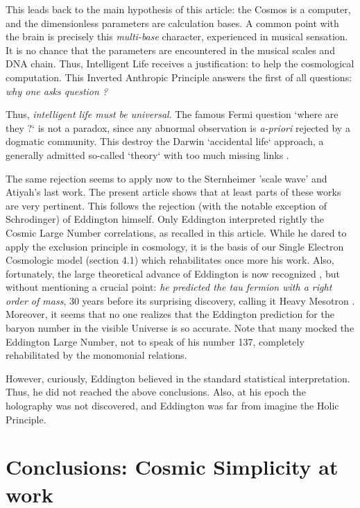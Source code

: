 \documentclass[twoside,draft]{article}
\begin{document}
\begin{sloppypar}
This leads back to the main hypothesis of this article: the Cosmos is a computer, and the dimensionless parameters are calculation bases. A common point with the brain is precisely this \textit{multi-base} character, experienced in musical sensation. It is no chance that the parameters are encountered in the musical scales and DNA chain. Thus, Intelligent Life receives a justification: to help the cosmological computation. This Inverted Anthropic Principle answers the first of all questions: \textit{why one asks question ?} 

Thus, \textit{intelligent life must be universal}. The famous Fermi question `where are they ?` is not a paradox, since any abnormal observation is \textit{a-priori} rejected by a dogmatic community. This destroy the Darwin `accidental life` approach, a generally admitted so-called `theory` with too much missing links \cite{Chauvin}.

The same rejection seems to apply now to the Sternheimer 'scale wave' and Atiyah's last work. The present article shows that at least parts of these works are very pertinent. This follows the rejection (with the notable exception of Schrodinger) of Eddington\cite{Eddington} himself. Only Eddington interpreted rightly the Cosmic Large Number correlations, as recalled in this article. While he dared to apply the exclusion principle in cosmology, it is the basis of our Single Electron Cosmologic model (section 4.1) which rehabilitates once more his work. Also, fortunately, the large theoretical advance of Eddington is now recognized \cite{Durham}, but without mentioning a crucial point: \textit{he predicted the tau fermion with a right order of mass}, 30 years before its surprising discovery, calling it Heavy Mesotron \cite{Eddington}. Moreover, it seems that no one realizes that the Eddington prediction for the baryon number in the visible Universe is so accurate. Note that many mocked the Eddington Large Number, not to speak of his number 137, completely rehabilitated by the monomonial relations.

However, curiously, Eddington believed in the standard statistical interpretation. Thus, he did not reached the above conclusions. Also, at his epoch the holography was not discovered, and Eddington was far from imagine the Holic Principle. 



\section {Conclusions: Cosmic Simplicity at work}


\end{sloppypar}
\end{document}
